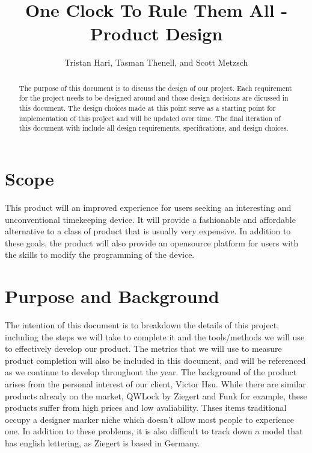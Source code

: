 \documentclass[10pt,draftclsnofoot,onecolumn]{IEEEtran}
\begin{document}
\title{One Clock To Rule Them All - Product Design}
\author{Tristan Hari, Tasman Thenell, and Scott Metzsch}
\maketitle
\begin{abstract}
The purpose of this document is to discuss the design of our project.
Each requirement for the project needs to be designed around and those design decisions are dicussed in this document.
The design choices made at this point serve as a starting point for implementation of this project and will be updated over time.
The final iteration of this document with include all design requirements, specifications, and design choices.
\end{abstract}

\newpage

\section{Scope}
This product will an improved experience for users seeking an interesting and unconventional timekeeping device.
It will provide a fashionable and affordable alternative to a class of product that is usually very expensive.
In addition to these goals, the product will also provide an opensource platform for users with the skills to modify the programming of the device.

\section{Purpose and Background}
The intention of this document is to breakdown the details of this project, including the steps we will take to complete it and the tools/methods we will use to effectively develop our product.
The metrics that we will use to measure product completion will also be included in this document, and will be referenced as we continue to develop throughout the year.
The background of the product arises from the personal interest of our client, Victor Hsu.
While there are similar products already on the market, QWLock by Ziegert and Funk for example, these products suffer from high prices and low avaliability.
Thses items traditional occupy a designer marker niche which doesn't allow most people to experience one.
In addition to these problems, it is also difficult to track down a model that has english lettering, as Ziegert is based in Germany.
\end{document}
